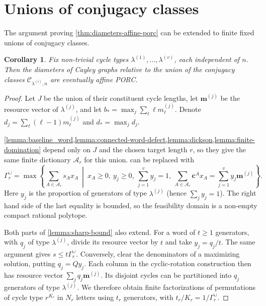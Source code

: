 \documentclass[DIV=12,10pt]{scrartcl}
\newtheorem{corollary}{Corollary}
\theoremstyle{definition}
\newcommand{\cvec}{\mathbf{c}}
\newcommand{\mvec}{\mathbf{m}}
\newcommand{\dict}{\mathcal{A}}
\newcommand{\cc}{\mathcal{C}}
\begin{document}
\section{Unions of conjugacy classes}
\label{sec:conjugacy-classes-unions}
The argument proving \cref{thm:diameters-affine-porc} can be extended to finite fixed unions of conjugacy classes.
\begin{corollary}
	\label{cor:classes-unions}
	Fix non-trivial cycle types $\lambda^{(1)},\ldots,\lambda^{(v)}$, each independent of $n$. Then the diameters of Cayley graphs relative to the union of the conjugacy classes $\cc_{\lambda^{(i)},n}$ are eventually affine PORC. 
\end{corollary}
\begin{proof}
Let $J$ be the union of their constituent cycle lengths, let $\mvec^{(j)}$ be the resource vector of $\lambda^{(j)}$, and let $b_* = \max_j \sum_\ell \ell m^{(j)}_\ell$. Denote $d_j = \sum_\ell (\ell-1)m^{(j)}_\ell$ and $d_* = \max_j d_j$.

\cref{lemma:baseline_word,lemma:connected-word-defect,lemma:dickson,lemma:finite-domination} depend only on $J$ and the chosen target length $r$, so they give the same finite dictionary $\dict_r$ for this union.  can be replaced with
\begin{equation}
	\label{eq:gamma-r-union}
	\Gamma_r^{\cup} = \max\left\{ \sum_{A\in\dict_r} s_A x_A \ \middle|\ x_A\geqslant 0,\ y_j\geqslant 0,\ \sum_{j=1}^v y_j=1,\ \sum_{A\in\dict_r} \cvec^A x_A = \sum_{j=1}^v y_j \mvec^{(j)} \right\}.
\end{equation}
Here $y_j$ is the proportion of generators of type $\lambda^{(j)}$ (hence $\sum_j y_j=1$). The right hand side of the last equality is bounded, so the feasibility domain is a non-empty compact rational polytope.

Both parts of \cref{lemma:sharp-bound} also extend. For a word of $t\geqslant 1$ generators, with $q_j$ of type $\lambda^{(j)}$, divide its resource vector by $t$ and take $y_j=q_j/t$. The same argument gives $s\leqslant t \Gamma_r^{\cup}$.  Conversely, clear the denominators of a maximizing solution, putting $q_j=Qy_j$. Each column in the cyclic-rotation construction then has resource vector $\sum_j q_j \mvec^{(j)}$. Its disjoint cycles can be partitioned into $q_j$ generators of type $\lambda^{(j)}$. We therefore obtain finite factorizations of permutations of cycle type $r^{K_r}$ in $N_r$ letters using $t_r$ generators, with $t_r/K_r = 1/\Gamma_r^{\cup}$.


\end{proof}
\end{document}
